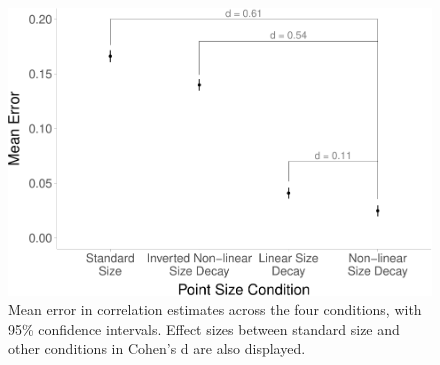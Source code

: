 \documentclass{vgtc}                          %
\begin{document}
\begin{figure}
\includegraphics[width=1\linewidth]{size_and_scatterplots_files/figure-latex/dot-plot-1} \caption{Mean error in correlation estimates across the four conditions, with 95\% confidence intervals. Effect sizes between standard size and other conditions in Cohen's d are also displayed.}\label{fig:dot-plot}
\end{figure}

\begin{table}

\caption{\label{tab:contrasts-table}Contrasts between the four levels of the size decay condition.}
\centering
{}
\end{table}
\end{document}
